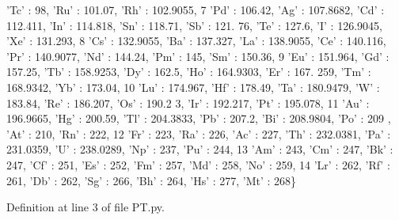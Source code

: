 \begin{DoxyCode}
{      'Tc'} : 98, \textcolor{stringliteral}{'Ru'} : 101.07, \textcolor{stringliteral}{'Rh'} : 102.9055, 
7                  \textcolor{stringliteral}{'Pd'} : 106.42, \textcolor{stringliteral}{'Ag'} : 107.8682, \textcolor{stringliteral}{'Cd'} : 112.411, \textcolor{stringliteral}{'In'} : 114.818, \textcolor{stringliteral}{'Sn'} : 118.71, \textcolor{stringliteral}{'Sb'} : 121.
      76, \textcolor{stringliteral}{'Te'} : 127.6, \textcolor{stringliteral}{'I'} : 126.9045, \textcolor{stringliteral}{'Xe'} : 131.293, 
8                  \textcolor{stringliteral}{'Cs'} : 132.9055, \textcolor{stringliteral}{'Ba'} : 137.327, \textcolor{stringliteral}{'La'} : 138.9055, \textcolor{stringliteral}{'Ce'} : 140.116, \textcolor{stringliteral}{'Pr'} : 140.9077, \textcolor{stringliteral}{'Nd'} : 
      144.24, \textcolor{stringliteral}{'Pm'} : 145, \textcolor{stringliteral}{'Sm'} : 150.36, 
9                  \textcolor{stringliteral}{'Eu'} : 151.964, \textcolor{stringliteral}{'Gd'} : 157.25, \textcolor{stringliteral}{'Tb'} : 158.9253, \textcolor{stringliteral}{'Dy'} : 162.5, \textcolor{stringliteral}{'Ho'} : 164.9303, \textcolor{stringliteral}{'Er'} : 167.
      259, \textcolor{stringliteral}{'Tm'} : 168.9342, \textcolor{stringliteral}{'Yb'} : 173.04, 
10                  \textcolor{stringliteral}{'Lu'} : 174.967, \textcolor{stringliteral}{'Hf'} : 178.49, \textcolor{stringliteral}{'Ta'} : 180.9479, \textcolor{stringliteral}{'W'} : 183.84, \textcolor{stringliteral}{'Re'} : 186.207, \textcolor{stringliteral}{'Os'} : 190.2
      3, \textcolor{stringliteral}{'Ir'} : 192.217, \textcolor{stringliteral}{'Pt'} : 195.078, 
11                  \textcolor{stringliteral}{'Au'} : 196.9665, \textcolor{stringliteral}{'Hg'} : 200.59, \textcolor{stringliteral}{'Tl'} : 204.3833, \textcolor{stringliteral}{'Pb'} : 207.2, \textcolor{stringliteral}{'Bi'} : 208.9804, \textcolor{stringliteral}{'Po'} : 209
      , \textcolor{stringliteral}{'At'} : 210, \textcolor{stringliteral}{'Rn'} : 222, 
12                  \textcolor{stringliteral}{'Fr'} : 223, \textcolor{stringliteral}{'Ra'} : 226, \textcolor{stringliteral}{'Ac'} : 227, \textcolor{stringliteral}{'Th'} : 232.0381, \textcolor{stringliteral}{'Pa'} : 231.0359, \textcolor{stringliteral}{'U' : 238.0289, '}Np'
       : 237, 'Pu' : 244, 
13                  \textcolor{stringliteral}{'Am'} : 243, \textcolor{stringliteral}{'Cm'} : 247, \textcolor{stringliteral}{'Bk'} : 247, \textcolor{stringliteral}{'Cf'} : 251, \textcolor{stringliteral}{'Es'} : 252, \textcolor{stringliteral}{'Fm'} : 257, \textcolor{stringliteral}{'Md'} : 258, \textcolor{stringliteral}{'No'} :
       259, 
14                  \textcolor{stringliteral}{'Lr'} : 262, \textcolor{stringliteral}{'Rf'} : 261, \textcolor{stringliteral}{'Db'} : 262, \textcolor{stringliteral}{'Sg'} : 266, \textcolor{stringliteral}{'Bh'} : 264, \textcolor{stringliteral}{'Hs'} : 277, \textcolor{stringliteral}{'Mt'} : 268\}
\end{DoxyCode}


Definition at line 3 of file P\+T.\+py.

